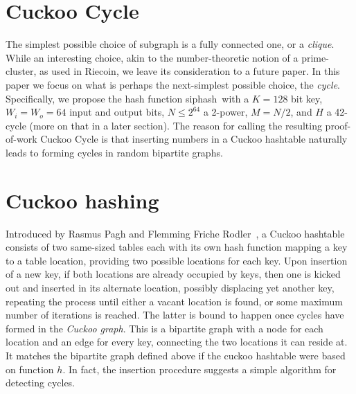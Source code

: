 \documentclass[11pt, oneside]{article}
\newcommand{\hash}{{\rm siphash}}
\begin{document}
\section{Cuckoo Cycle}
The simplest possible choice of subgraph is a fully connected one, or a {\em clique}.
While an interesting choice, akin to the number-theoretic notion of a prime-cluster,
as used in Riecoin, we leave its consideration to a future paper.
In this paper we focus on what is perhaps the next-simplest possible choice, the {\em cycle}.
Specifically, we propose the hash function \hash\ with a $K=128$ bit key, $W_i = W_o = 64$ input
and output bits, $N \leq 2^{64}$ a 2-power, $M=N/2$, and $H$ a 42-cycle (more on that in a later section).
The reason for calling the resulting proof-of-work Cuckoo Cycle is that
inserting numbers in a Cuckoo hashtable naturally leads to forming cycles
in random bipartite graphs.

\section{Cuckoo hashing}
Introduced by Rasmus Pagh and Flemming Friche
Rodler~\cite{Pagh04cuckoohashing}, a Cuckoo hashtable consists of two
same-sized tables each with its own hash function mapping a key to a table
location, providing two possible locations for each key.
Upon insertion of a new key, if both locations are already occupied by keys,
then one is kicked out and inserted in its alternate location, possibly
displacing yet another key, repeating the process until either a vacant
location is found, or some maximum number of iterations is reached.
The latter is bound to happen once cycles have formed in the {\em Cuckoo graph}.
This is a bipartite graph with a node for each location and an
edge for every key, connecting the two locations it can reside at.
It matches the bipartite graph defined above if the cuckoo hashtable
were based on function $h$.
In fact, the insertion procedure suggests a simple algorithm for detecting cycles.
\end{document}
